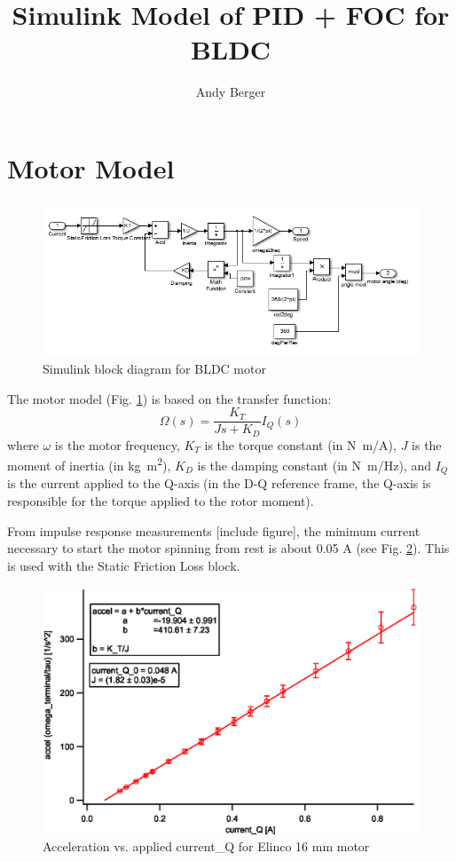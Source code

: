 \documentclass[11pt]{article} %
\title{Simulink Model of PID + FOC for BLDC}
\author{Andy Berger}
\begin{document}
\maketitle

\section{Motor Model}

\begin{figure}
\centering
\includegraphics[scale=0.75]{BLDCblockDiagram.png}
\caption{Simulink block diagram for BLDC motor}
\label{fig:BLDCblockDiagram}
\end{figure}

The motor model (Fig. \ref{fig:BLDCblockDiagram}) is based on the transfer function:
\begin{equation}
\Omega(s) = \frac{K_T}{J s + K_D} I_Q(s)
\end{equation}
\noindent where $\omega$ is the motor frequency, $K_T$ is the torque constant (in \si{N.m/A}), $J$ is the moment of inertia (in \si{kg.m^2}), $K_D$ is the damping constant (in \si{N.m/Hz}), and $I_Q$ is the current applied to the Q-axis (in the D-Q reference frame, the Q-axis is responsible for the torque applied to the rotor moment).

From impulse response measurements [include figure], the minimum current necessary to start the motor spinning from rest is about 0.05 A (see Fig. \ref{fig:accelVsCurrent}). This is used with the Static Friction Loss block. 
\begin{figure}
\centering
\includegraphics[scale=0.75]{accelVsCurrent.eps}
\caption{Acceleration vs. applied current\_Q for Elinco 16 mm motor}
\label{fig:accelVsCurrent}
\end{figure}
\end{document}

